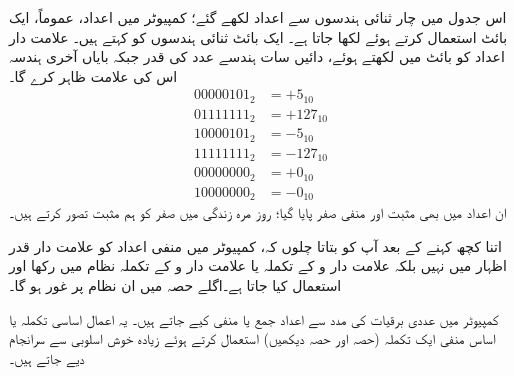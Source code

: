 اس جدول میں چار ثنائی ہندسوں سے اعداد لکھے گئے؛ کمپیوٹر میں اعداد، عموماً، ایک بائٹ استعمال کرتے ہوئے لکھا جاتا ہے۔ ایک بائٹ  ثنائی ہندسوں کو کہتے ہیں۔ علامت دار اعداد کو بائٹ میں لکھتے ہوئے، دائیں سات ہندسے عدد کی قدر جبکہ بایاں آخری ہندسہ اس کی علامت ظاہر کرے گا۔
\begin{align*}
00000101_2&=+5_{10}\\
01111111_2&=+127_{10}\\
10000101_2&=-5_{10}\\
11111111_2&=-127_{10}\\
00000000_2&=+0_{10}\\
10000000_2&=-0_{10}
\end{align*}
ان اعداد میں بھی مثبت اور منفی صفر پایا گیا؛ روز مرہ زندگی میں صفر کو ہم مثبت تصور کرتے ہیں۔

اتنا کچھ کہنے کے بعد آپ کو بتاتا چلوں کہ، کمپیوٹر میں منفی اعداد کو  علامت دار قدر اظہار میں نہیں بلکہ علامت دار و  کے تکملہ یا علامت دار و  کے تکملہ نظام میں رکھا اور استعمال کیا جاتا ہے۔اگلے حصہ میں ان نظام پر غور ہو گا۔

کمپیوٹر میں عددی برقیات کی مدد سے اعداد جمع یا منفی کیے جاتے ہیں۔ یہ اعمال اساسی تکملہ یا اساس منفی ایک  تکملہ (حصہ  اور حصہ  دیکھیں) استعمال کرتے ہوئے زیادہ خوش اسلوبی سے سرانجام دیے جاتے ہیں۔


